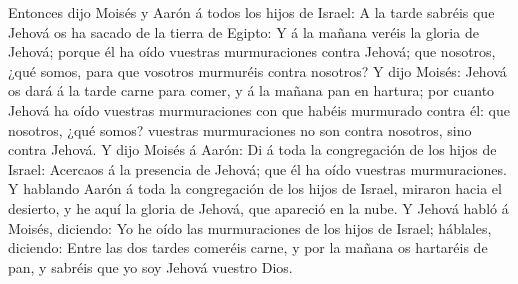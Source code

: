  Entonces dijo Moisés y Aarón á todos los hijos de Israel: A
la tarde sabréis que Jehová os ha sacado de la tierra de Egipto:
 Y á la mañana veréis la gloria de Jehová; porque él ha oído
vuestras murmuraciones contra Jehová; que nosotros, ¿qué somos, para que
vosotros murmuréis contra nosotros?  Y dijo Moisés: Jehová
os dará á la tarde carne para comer, y á la mañana pan en hartura; por
cuanto Jehová ha oído vuestras murmuraciones con que habéis murmurado
contra él: que nosotros, ¿qué somos? vuestras murmuraciones no son
contra nosotros, sino contra Jehová.  Y dijo Moisés á Aarón:
Di á toda la congregación de los hijos de Israel: Acercaos á la
presencia de Jehová; que él ha oído vuestras murmuraciones.
 Y hablando Aarón á toda la congregación de los hijos de
Israel, miraron hacia el desierto, y he aquí la gloria de Jehová, que
apareció en la nube.  Y Jehová habló á Moisés, diciendo:
 Yo he oído las murmuraciones de los hijos de Israel;
háblales, diciendo: Entre las dos tardes comeréis carne, y por la mañana
os hartaréis de pan, y sabréis que yo soy Jehová vuestro Dios.

